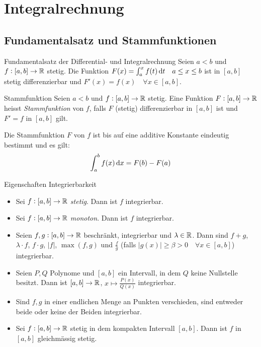 \section{Integralrechnung}

\subsection{Fundamentalsatz und Stammfunktionen}

\begin{theorem}{Fundamentalsatz der Differential- und Integralrechnung}
    Seien $a<b$ und $f:[a,b] \to \mathbb{R}$ stetig.
    Die Funktion $F(x) = \int_{a}^{x} f(t) \dif t \quad a \leq x \leq b$ ist in $[a,b]$ stetig differenzierbar und $F'(x) = f(x) \quad \forall x \in [a,b]$.
\end{theorem}

\begin{definition}{Stammfunktion}
    Seien $a<b$ und $f:[a,b] \to \mathbb{R}$ stetig.
    Eine Funktion $F: [a,b] \to \mathbb{R}$ heisst \emph{Stammfunktion} von $f$, falls $F$ (stetig) differenzierbar in $[a,b]$ ist und $F' = f$ in $[a,b]$ gilt.

    Die Stammfunktion $F$ von $f$ ist bis auf eine additive Konstante eindeutig bestimmt und es gilt:
    \begin{equation}
        \int_{a}^{b} f(x) \dif x = F(b) - F(a)
    \end{equation}
\end{definition}

\begin{theorem}{Eigenschaften Integrierbarkeit}
    \begin{itemize}
        \item Sei $f : [a,b] \to \mathbb{R}$ \textit{stetig}. Dann ist $f$ integrierbar.
        \item Sei $f: [a,b] \to \mathbb{R}$ \textit{monoton}. Dann ist $f$ integrierbar.
        \item Seien $f,g : [a,b] \to \mathbb{R}$ beschränkt, integrierbar und $\lambda \in \mathbb{R}$.
                Dann sind $f+g$, $\lambda \cdot f$, $f \cdot g$, $|f|$, $\max(f,g)$ und $\frac{f}{g}$
                (falls $|g(x)| \geq \beta > 0 \quad \forall x \in [a,b]$) integrierbar.
        \item Seien $P,Q$ Polynome und $[a,b]$ ein Intervall, in dem $Q$ keine Nullstelle besitzt. Dann ist $[a,b] \to \mathbb{R}$, $x \mapsto \frac{P(x)}{Q(x)}$ integrierbar.
        \item Sind $f, g$ in einer endlichen Menge an Punkten verschieden, sind entweder beide oder keine der Beiden integrierbar.
        \item Sei $f: [a,b] \to \mathbb{R}$ stetig in dem kompakten Intervall $[a,b]$. Dann ist $f$ in $[a,b]$ gleichmässig stetig.
    \end{itemize}
\end{theorem}

